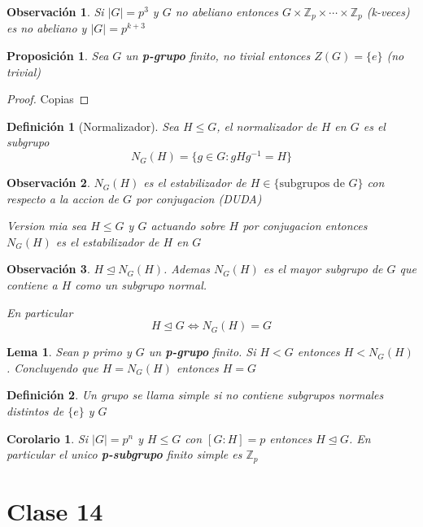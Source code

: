 \documentclass[10pt]{extarticle}
\theoremstyle{break}
\newtheorem{corollary}{Corolario}[theorem]
\newtheorem{lemma}[theorem]{Lema}
\newtheorem{proposition}{Proposición}
\newtheorem*{remark}{Observación}
\newtheorem{definition}{Definición}[section]
\theoremstyle{definition}
\begin{document}
\begin{remark}
	Si $\lvert G \rvert =p^{3}$ y $G$ no abeliano entonces $G\times \mathbb{Z}_{p}\times\cdots\times\mathbb{Z}_{p}$ (k-veces) es no abeliano y $\lvert G \rvert =p^{k+3}$ 
\end{remark}

\begin{proposition}
	Sea $G$ un \textbf{p-grupo} finito, no tivial entonces $Z(G)=\{e\}$ (no trivial)
\end{proposition}
\begin{proof}
	Copias
\end{proof}

\begin{definition}[Normalizador]
	Sea $H\leq G$, el normalizador de $H$ en $G$ es el subgrupo
	$$N_{G}(H)= \{g\in G: gHg^{-1}=H\}$$ 
\end{definition}

\begin{remark}
	$N_{G}(H)$ es el estabilizador de $H\in \{\text{subgrupos de } G\}$ con respecto a la accion de $G$ por conjugacion (DUDA)
	
	Version mia sea $H\leq G$ y $G$ actuando sobre $H$ por conjugacion entonces $N_{G}(H)$ es el estabilizador de $H$ en $G$ 
\end{remark}

\begin{remark}
	$H\trianglelefteq N_{G}(H)$. Ademas $N_{G}(H)$ es el mayor subgrupo de $G$ que contiene a $H$ como un subgrupo normal. 

	En particular $$H\trianglelefteq G\iff N_{G}(H)=G$$
\end{remark}

\begin{lemma}
	Sean $p$ primo y $G$ un \textbf{p-grupo} finito. Si $H<G$ entonces $H<N_{G}(H)$. Concluyendo que $H=N_{G}(H)$ entonces $H=G$    
\end{lemma}

\begin{definition}
	Un grupo se llama simple si no contiene subgrupos normales distintos de $\{e\}$ y $G$
\end{definition}

\begin{corollary}
	Si $\lvert G \rvert =p^{n}$ y $H\leq G$ con $[G:H]=p$ entonces $H\trianglelefteq G$. En particular el unico \textbf{p-subgrupo} finito simple es $\mathbb{Z}_{p}$  
\end{corollary}


\section{Clase 14}
\end{document}
